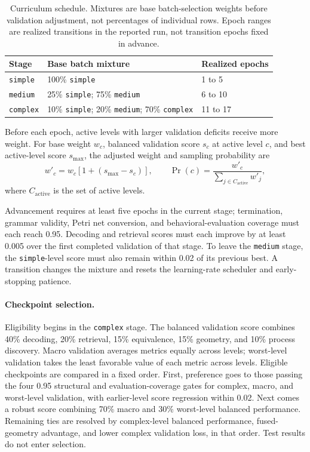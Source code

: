 \documentclass[mathematics,article,submit,moreauthors]{Definitions/mdpi}
\begin{document}
\begin{table}[!htb]
\centering
\caption{Curriculum schedule. Mixtures are base batch-selection weights before validation adjustment, not percentages of individual rows. Epoch ranges are realized transitions in the reported run, not transition epochs fixed in advance.}
\label{tab:curriculum-schedule}
\begin{tabularx}{\textwidth}{@{}Q{0.16\textwidth}YQ{0.17\textwidth}@{}}
\toprule
Stage & Base batch mixture & Realized epochs \\
\midrule
\texttt{simple} & 100\% \texttt{simple} & 1 to 5 \\
\texttt{medium} & 25\% \texttt{simple}; 75\% \texttt{medium} & 6 to 10 \\
\texttt{complex} & 10\% \texttt{simple}; 20\% \texttt{medium}; 70\% \texttt{complex} & 11 to 17 \\
\bottomrule
\end{tabularx}
\end{table}

Before each epoch, active levels with larger validation deficits receive more weight. For base weight $w_c$, balanced validation score $s_c$ at active level $c$, and best active-level score $s_{\max}$, the adjusted weight and sampling probability are
\begin{equation}
w'_c=w_c[1+(s_{\max}-s_c)],\qquad
\Pr(c)=\frac{w'_c}{\sum_{j\in C_{\mathrm{active}}}w'_j},
\end{equation}
where $C_{\mathrm{active}}$ is the set of active levels.

Advancement requires at least five epochs in the current stage; termination, grammar validity, Petri net conversion, and behavioral-evaluation coverage must each reach 0.95. Decoding and retrieval scores must each improve by at least 0.005 over the first completed validation of that stage. To leave the \texttt{medium} stage, the \texttt{simple}-level score must also remain within 0.02 of its previous best. A transition changes the mixture and resets the learning-rate scheduler and early-stopping patience.

\paragraph{Checkpoint selection.}
Eligibility begins in the \texttt{complex} stage. The balanced validation score combines 40\% decoding, 20\% retrieval, 15\% equivalence, 15\% geometry, and 10\% process discovery. Macro validation averages metrics equally across levels; worst-level validation takes the least favorable value of each metric across levels. Eligible checkpoints are compared in a fixed order. First, preference goes to those passing the four 0.95 structural and evaluation-coverage gates for complex, macro, and worst-level validation, with earlier-level score regression within 0.02. Next comes a robust score combining 70\% macro and 30\% worst-level balanced performance. Remaining ties are resolved by complex-level balanced performance, fused-geometry advantage, and lower complex validation loss, in that order. Test results do not enter selection.
\end{document}
